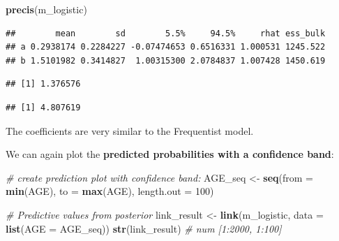 \documentclass[
]{article}
\newenvironment{Shaded}{\begin{snugshade}}{\end{snugshade}}
\newcommand{\AttributeTok}[1]{\textcolor[rgb]{0.13,0.29,0.53}{#1}}
\newcommand{\CommentTok}[1]{\textcolor[rgb]{0.56,0.35,0.01}{\textit{#1}}}
\newcommand{\DecValTok}[1]{\textcolor[rgb]{0.00,0.00,0.81}{#1}}
\newcommand{\FunctionTok}[1]{\textcolor[rgb]{0.13,0.29,0.53}{\textbf{#1}}}
\newcommand{\NormalTok}[1]{#1}
\newcommand{\OtherTok}[1]{\textcolor[rgb]{0.56,0.35,0.01}{#1}}
\newcommand{\SpecialCharTok}[1]{\textcolor[rgb]{0.81,0.36,0.00}{\textbf{#1}}}
\begin{document}
\begin{Shaded}
\begin{Highlighting}[]
\FunctionTok{precis}\NormalTok{(m\_logistic)}
\end{Highlighting}
\end{Shaded}

\begin{verbatim}
##        mean        sd        5.5%     94.5%     rhat ess_bulk
## a 0.2938174 0.2284227 -0.07474653 0.6516331 1.000531 1245.522
## b 1.5101982 0.3414827  1.00315300 2.0784837 1.007428 1450.619
\end{verbatim}

\begin{Shaded}
\end{Shaded}

\begin{verbatim}
## [1] 1.376576
\end{verbatim}

\begin{Shaded}
\end{Shaded}

\begin{verbatim}
## [1] 4.807619
\end{verbatim}

The coefficients are very similar to the Frequentist model.

We can again plot the \textbf{predicted probabilities with a confidence
band}:

\begin{Shaded}
\begin{Highlighting}[]
\CommentTok{\# create prediction plot with confidence band:}
\NormalTok{AGE\_seq }\OtherTok{\textless{}{-}} \FunctionTok{seq}\NormalTok{(}\AttributeTok{from =} \FunctionTok{min}\NormalTok{(AGE), }\AttributeTok{to =} \FunctionTok{max}\NormalTok{(AGE), }\AttributeTok{length.out =} \DecValTok{100}\NormalTok{)}

\CommentTok{\# Predictive values from posterior}
\NormalTok{link\_result }\OtherTok{\textless{}{-}} \FunctionTok{link}\NormalTok{(m\_logistic, }\AttributeTok{data =} \FunctionTok{list}\NormalTok{(}\AttributeTok{AGE =}\NormalTok{ AGE\_seq))}
\FunctionTok{str}\NormalTok{(link\_result) }\CommentTok{\# num [1:2000, 1:100]}
\end{Highlighting}
\end{Shaded}
\end{document}
